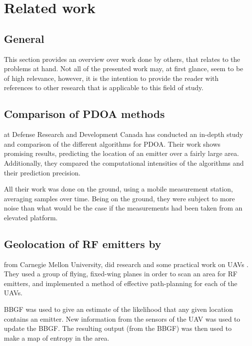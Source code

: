 \documentclass[10pt,a4paper]{book}
\begin{document}
\newpage

\section{Related work}
\glsresetall

\subsection{General}

This section provides an overview over work done by others, that relates to the problems at hand. Not all of the presented work may, at first glance, seem to be of high relevance, however, it is the intention to provide the reader with references to other research that is applicable to this field of study.

\subsection{Comparison of \acrshort{PDOA} methods}

\citet{jackson2011emitter} at Defense Research and Development Canada has conducted an in-depth study and comparison of the different algorithms for \gls{PDOA}. Their work shows promising results, predicting the location of an emitter over a fairly large area. Additionally, they compared the computational intensities of the algorithms and their prediction precision. 

All their work was done on the ground, using a mobile measurement station, averaging samples over time. Being on the ground, they were subject to more noise than what would be the case if the measurements had been taken from an elevated platform.

\subsection{Geolocation of \acrshort{RF} emitters by }
 
\citet{scerri2007geolocation} from Carnegie Mellon University, did research and some practical work on \glspl{UAV} \cite{scerri2007geolocation,scerri2008transitioning}. They used a group of flying, fixed-wing planes in order to scan an area for \gls{RF} emitters, and implemented a method of effective path-planning for each of the \glspl{UAV}. 

\gls{BBGF} was used to give an estimate of the likelihood that any given location contains an emitter. New information from the sensors of the \gls{UAV} was used to update the \gls{BBGF}. The resulting output (from the \gls{BBGF}) was then used to make a map of entropy in the area. 
\end{document}
